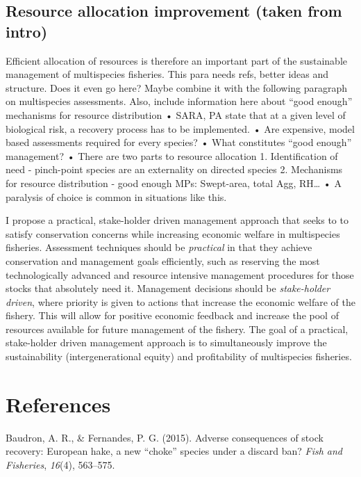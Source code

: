 \documentclass[12pt,]{scrartcl}
\begin{document}
\subsection{Resource allocation improvement (taken from
intro)}\label{resource-allocation-improvement-taken-from-intro}

Efficient allocation of resources is therefore an important part of the
sustainable management of multispecies fisheries. This para needs refs,
better ideas and structure. Does it even go here? Maybe combine it with
the following paragraph on multispecies assessments. Also, include
information here about ``good enough'' mechanisms for resource
distribution • SARA, PA state that at a given level of biological risk,
a recovery process has to be implemented. • Are expensive, model based
assessments required for every species? • What constitutes ``good
enough'' management? • There are two parts to resource allocation 1.
Identification of need - pinch-point species are an externality on
directed species 2. Mechanisms for resource distribution - good enough
MPs: Swept-area, total Agg, RH\ldots{} • A paralysis of choice is common
in situations like this.

I propose a practical, stake-holder driven management approach that
seeks to to satisfy conservation concerns while increasing economic
welfare in multispecies fisheries. Assessment techniques should be
\emph{practical} in that they achieve conservation and management goals
efficiently, such as reserving the most technologically advanced and
resource intensive management procedures for those stocks that
absolutely need it. Management decisions should be \emph{stake-holder
driven}, where priority is given to actions that increase the economic
welfare of the fishery. This will allow for positive economic feedback
and increase the pool of resources available for future management of
the fishery. The goal of a practical, stake-holder driven management
approach is to simultaneously improve the sustainability
(intergenerational equity) and profitability of multispecies fisheries.

\section*{References}
\setlength{\parindent}{-0.2in}
\singlespacing
\small
\setlength{\leftskip}{0.2in}
\setlength{\parskip}{8pt}
\vspace*{-0.4in}
\noindent

\hypertarget{refs}{}
\hypertarget{ref-baudron2015adverse}{}
Baudron, A. R., \& Fernandes, P. G. (2015). Adverse consequences of
stock recovery: European hake, a new ``choke'' species under a discard
ban? \emph{Fish and Fisheries}, \emph{16}(4), 563--575.
\end{document}
